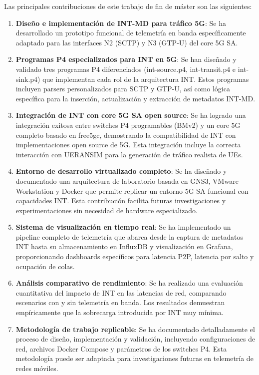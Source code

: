Las principales contribuciones de este trabajo de fin de máster son las siguientes:
\begin{enumerate}
    \item \textbf{Diseño e implementación de INT-MD para tráfico 5G}: Se ha desarrollado un prototipo funcional de telemetría en banda específicamente adaptado para las interfaces N2 (SCTP) y N3 (GTP-U) del core 5G SA. 

    \item \textbf{Programas P4 especializados para INT en 5G}: Se han diseñado y validado tres programas P4 diferenciados (int-source.p4, int-transit.p4 e int-sink.p4) que implementan cada rol de la arquitectura INT. Estos programas incluyen parsers personalizados para SCTP y GTP-U, así como lógica específica para la inserción, actualización y extracción de metadatos INT-MD.
    
    \item \textbf{Integración de INT con core 5G SA open source}: Se ha logrado una integración exitosa entre switches P4 programables (BMv2) y un core 5G completo basado en free5gc, demostrando la compatibilidad de INT con implementaciones open source de 5G. Esta integración incluye la correcta interacción con UERANSIM \cite{ueransim} para la generación de tráfico realista de UEs.
    
    \item \textbf{Entorno de desarrollo virtualizado completo}: Se ha diseñado y documentado una arquitectura de laboratorio basada en GNS3, VMware Workstation y Docker que permite replicar un entorno 5G SA funcional con capacidades INT. Esta contribución facilita futuras investigaciones y experimentaciones sin necesidad de hardware especializado.
    
    \item \textbf{Sistema de visualización en tiempo real}: Se ha implementado un pipeline completo de telemetría que abarca desde la captura de metadatos INT hasta su almacenamiento en InfluxDB y visualización en Grafana, proporcionando dashboards específicos para latencia P2P, latencia por salto y ocupación de colas.
    
    \item \textbf{Análisis comparativo de rendimiento}: Se ha realizado una evaluación cuantitativa del impacto de INT en las latencias de red, comparando escenarios con y sin telemetría en banda. Los resultados demuestran empíricamente que la sobrecarga introducida por INT muy mínima.
    
    \item \textbf{Metodología de trabajo replicable}: Se ha documentado detalladamente el proceso de diseño, implementación y validación, incluyendo configuraciones de red, archivos Docker Compose y parámetros de los switches P4. Esta metodología puede ser adaptada para investigaciones futuras en telemetría de redes móviles.
\end{enumerate}

